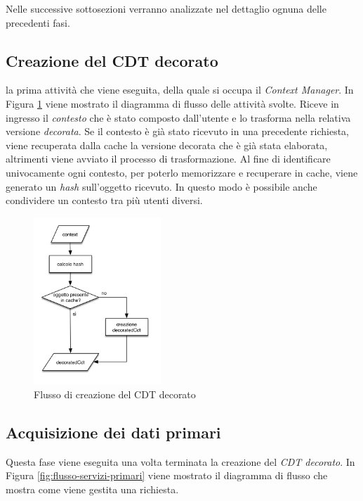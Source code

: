 Nelle successive sottosezioni verranno analizzate nel dettaglio ognuna delle precedenti fasi.

\subsection*{Creazione del CDT decorato}

\upe la prima attività che viene eseguita, della quale si occupa il \emph{Context Manager}. In Figura \ref{fig:flusso-decorated-cdt} viene mostrato il diagramma di flusso delle attività svolte. Riceve in ingresso il \emph{contesto} che è stato composto dall'utente e lo trasforma nella relativa versione \emph{decorata}. Se il contesto è già stato ricevuto in una precedente richiesta, viene recuperata dalla cache la versione decorata che è già stata elaborata, altrimenti viene avviato il processo di trasformazione. Al fine di identificare univocamente ogni contesto, per poterlo memorizzare e recuperare in cache, viene generato un \emph{hash} sull'oggetto ricevuto. In questo modo è possibile anche condividere un contesto tra più utenti diversi.

\begin{figure}[ht]
	\centering
	\includegraphics[width=0.43\textwidth]{5-implementazione-backend/Immagini/diagramma_flusso_decoratedCdt.png}
	\caption{Flusso di creazione del CDT decorato\label{fig:flusso-decorated-cdt}}
\end{figure}

\subsection*{Acquisizione dei dati primari}

Questa fase viene eseguita una volta terminata la creazione del \emph{CDT decorato}. In Figura \ref{fig:flusso-servizi-primari} viene mostrato il diagramma di flusso che mostra come viene gestita una richiesta.

